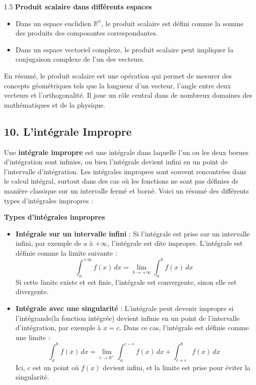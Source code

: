\documentclass[12pt]{article}
\begin{document}
\begin{spacing}{1.5}
\textbf{ Produit scalaire dans différents espaces}

\begin{itemize}
    \item Dans un espace euclidien \( \mathbb{R}^n \), le produit scalaire est défini comme la somme des produits des composantes correspondantes.
    \item Dans un espace vectoriel complexe, le produit scalaire peut impliquer la conjugaison complexe de l'un des vecteurs.
\end{itemize}

En résumé, le produit scalaire est une opération qui permet de mesurer des concepts géométriques tels que la longueur d'un vecteur, l'angle entre deux vecteurs et l'orthogonalité. Il joue un rôle central dans de nombreux domaines des mathématiques et de la physique.




\subsection*{10. L'intégrale Impropre}

Une \textbf{intégrale impropre} est une intégrale dans laquelle l'un ou les deux bornes d'intégration sont infinies, ou bien l'intégrale devient infini en un point de l'intervalle d'intégration. Les intégrales impropres sont souvent rencontrées dans le calcul intégral, surtout dans des cas où les fonctions ne sont pas définies de manière classique sur un intervalle fermé et borné. Voici un résumé des différents types d'intégrales impropres :

\textbf{ Types d'intégrales impropres}

\begin{itemize}
    \item \textbf{Intégrale sur un intervalle infini} : Si l'intégrale est prise sur un intervalle infini, par exemple de \( a \) à \( +\infty \), l'intégrale est dite impropre. L'intégrale est définie comme la limite suivante :
    \[
    \int_a^{+\infty} f(x) \, dx = \lim_{b \to +\infty} \int_a^b f(x) \, dx
    \]
    Si cette limite existe et est finie, l'intégrale est convergente, sinon elle est divergente.
    
    \item \textbf{Intégrale avec une singularité} : L'intégrale peut devenir impropre si l'intégrande(la fonction intégrée) devient infinie en un point de l'intervalle d'intégration, par exemple à \( x = c \). Dans ce cas, l'intégrale est définie comme une limite :
    \[
    \int_a^b f(x) \, dx = \lim_{\epsilon \to 0^+} \int_{a}^{c-\epsilon} f(x) \, dx + \int_{c+\epsilon}^{b} f(x) \, dx
    \]
    Ici, \( c \) est un point où \( f(x) \) devient infini, et la limite est prise pour éviter la singularité.
    

\end{itemize}
\end{spacing}
\end{document}
